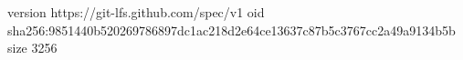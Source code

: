 version https://git-lfs.github.com/spec/v1
oid sha256:9851440b520269786897dc1ac218d2e64ce13637c87b5c3767cc2a49a9134b5b
size 3256
